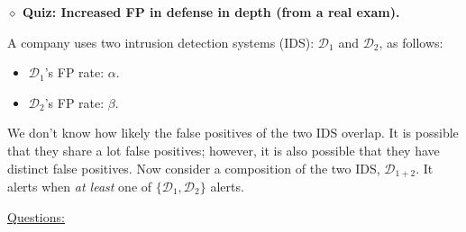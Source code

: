 \documentclass{article}
\newcommand{\parhead}[1]{\noindent \textbf{#1}}
\begin{document}

\parhead{$\diamond$ Quiz: Increased FP in defense in depth (from a real exam).}

\smallskip
A company uses two intrusion detection systems (IDS): $\mathcal{D}_1$ and $\mathcal{D}_2$, as follows:
\begin{itemize}
    \item $\mathcal{D}_1$'s FP rate: $\alpha$.
    \item $\mathcal{D}_2$'s FP rate: $\beta$.
\end{itemize}

We don't know how likely the false positives of the two IDS overlap. It is possible that they share a lot false positives; however, it is also possible that they have distinct false positives.
%
Now consider a composition of the two IDS, $\mathcal{D}_{1+2}$. It alerts when \emph{at least} one of $\{\mathcal{D}_1,\mathcal{D}_2\}$ alerts.

\smallskip
\underline{Questions:} 
\end{document}
